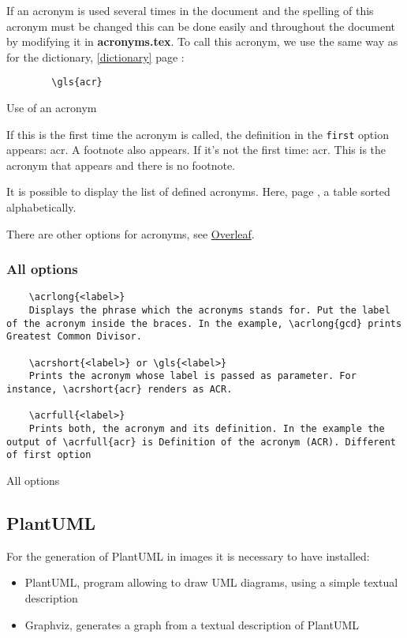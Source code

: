 If an acronym is used several times in the document and the spelling of this acronym must be changed
this can be done easily and throughout the document by modifying it in \textbf{acronyms.tex}.
To call this acronym, we use the same way as for the dictionary, \ref{dictionary} page
\pageref{dictionary} :
\begin{code}
    \begin{verbatim}
        \gls{acr}
\end{verbatim}
    \caption{Use of an acronym}
\end{code}

If this is the first time the acronym is called, the definition in the \texttt{first}
option appears: \gls{acr}.
A footnote also appears. \newline
If it's not the first time: \gls{acr}. This is the acronym that appears and there is no footnote.
\newline

It is possible to display the list of defined acronyms. Here, page \pageref{acronyms}, a table
sorted alphabetically.

There are other options for acronyms, see
\href{https://fr.overleaf.com/learn/latex/Glossaries}{Overleaf}.

\subsubsection{All options}

\begin{code}
    \begin{verbatim}
    \acrlong{<label>}
    Displays the phrase which the acronyms stands for. Put the label of the acronym inside the braces. In the example, \acrlong{gcd} prints Greatest Common Divisor.

    \acrshort{<label>} or \gls{<label>}
    Prints the acronym whose label is passed as parameter. For instance, \acrshort{acr} renders as ACR.

    \acrfull{<label>}
    Prints both, the acronym and its definition. In the example the output of \acrfull{acr} is Definition of the acronym (ACR). Different of first option
    \end{verbatim}
    \caption{All options}
\end{code}

\subsection{PlantUML} \label{plamtuml}
For the generation of PlantUML in images it is necessary to have installed:
\begin{itemize}
    \item PlantUML, program allowing to draw UML diagrams, using a simple textual description
    \item Graphviz, generates a graph from a textual description of PlantUML
\end{itemize}

